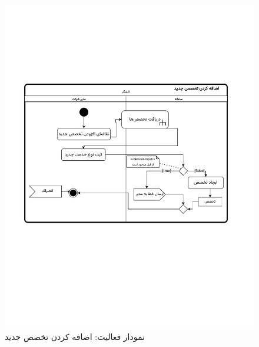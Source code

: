 \begin{figure}[ht!]
	\centering
	\includegraphics[scale=0.8, page=1]{figs/OOD-activity-nokhedmatjadid.pdf}
	\caption{نمودار فعالیت: اضافه کردن تخصص جدید}
\end{figure}
\FloatBarrier
\newpage


